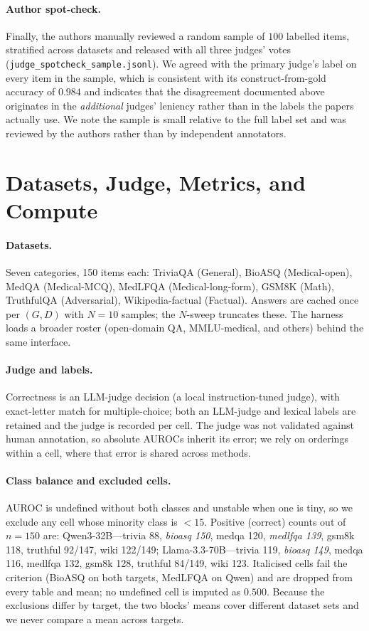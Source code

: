 \documentclass[11pt]{article}
\begin{document}
\paragraph{Author spot-check.} Finally, the authors manually reviewed a random sample of $100$
labelled items, stratified across datasets and released with all three judges' votes
(\texttt{judge\_spotcheck\_sample.jsonl}). We agreed with the primary judge's label on every
item in the sample, which is consistent with its construct-from-gold accuracy of $0.984$ and
indicates that the disagreement documented above originates in the \emph{additional} judges'
leniency rather than in the labels the papers actually use. We note the sample is small
relative to the full label set and was reviewed by the authors rather than by independent
annotators.

\section{Datasets, Judge, Metrics, and Compute}\label{app:details}
\paragraph{Datasets.} Seven categories, 150 items each: TriviaQA (General), BioASQ
(Medical-open), MedQA (Medical-MCQ), MedLFQA (Medical-long-form), GSM8K (Math), TruthfulQA
(Adversarial), Wikipedia-factual (Factual). Answers are cached once per $(G,D)$ with $N{=}10$
samples; the $N$-sweep truncates these. The harness loads a broader roster (open-domain QA,
MMLU-medical, and others) behind the same interface.
\paragraph{Judge and labels.} Correctness is an LLM-judge decision (a local
instruction-tuned judge), with exact-letter match for multiple-choice; both an LLM-judge
and lexical labels are retained and the judge is recorded per cell. The judge was not
validated against human annotation, so absolute AUROCs inherit its error; we rely on
orderings within a cell, where that error is shared across methods.

\paragraph{Class balance and excluded cells.} AUROC is undefined without both classes and
unstable when one is tiny, so we exclude any cell whose minority class is $<15$. Positive
(correct) counts out of $n{=}150$ are: Qwen3-32B---trivia 88, \emph{bioasq 150}, medqa 120,
\emph{medlfqa 139}, gsm8k 118, truthful 92/147, wiki 122/149; Llama-3.3-70B---trivia 119,
\emph{bioasq 149}, medqa 116, medlfqa 132, gsm8k 128, truthful 84/149, wiki 123. Italicised
cells fail the criterion (BioASQ on both targets, MedLFQA on Qwen) and are dropped from every
table and mean; no undefined cell is imputed as $0.500$. Because the exclusions differ by
target, the two blocks' means cover different dataset sets and we never compare a mean across
targets.
\end{document}
